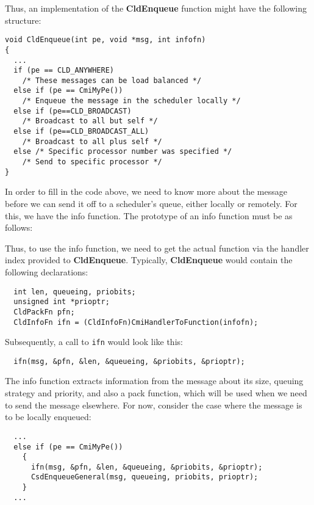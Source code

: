 Thus, an implementation of the {\bf CldEnqueue} function might have
the following structure:

\begin{verbatim}
void CldEnqueue(int pe, void *msg, int infofn)
{
  ...
  if (pe == CLD_ANYWHERE)
    /* These messages can be load balanced */
  else if (pe == CmiMyPe())
    /* Enqueue the message in the scheduler locally */
  else if (pe==CLD_BROADCAST) 
    /* Broadcast to all but self */
  else if (pe==CLD_BROADCAST_ALL)
    /* Broadcast to all plus self */
  else /* Specific processor number was specified */
    /* Send to specific processor */
}
\end{verbatim}

In order to fill in the code above, we need to know more about the
message before we can send it off to a scheduler's queue, either
locally or remotely.  For this, we have the info function.  The
prototype of an info function must be as follows:


Thus, to use the info function, we need to get the actual function via
the handler index provided to {\bf CldEnqueue}.  Typically, {\bf
CldEnqueue} would contain the following declarations:

\begin{verbatim}
  int len, queueing, priobits; 
  unsigned int *prioptr;
  CldPackFn pfn;
  CldInfoFn ifn = (CldInfoFn)CmiHandlerToFunction(infofn);
\end{verbatim}

\noindent Subsequently, a call to {\tt ifn} would look like this:

\begin{verbatim}
  ifn(msg, &pfn, &len, &queueing, &priobits, &prioptr);
\end{verbatim}

The info function extracts information from the message about its size,
queuing strategy and priority, and also a pack function, which will be
used when we need to send the message elsewhere.  For now, consider
the case where the message is to be locally enqueued:

\begin{verbatim}
  ...
  else if (pe == CmiMyPe())
    {
      ifn(msg, &pfn, &len, &queueing, &priobits, &prioptr);
      CsdEnqueueGeneral(msg, queueing, priobits, prioptr);
    }
  ...
\end{verbatim}

